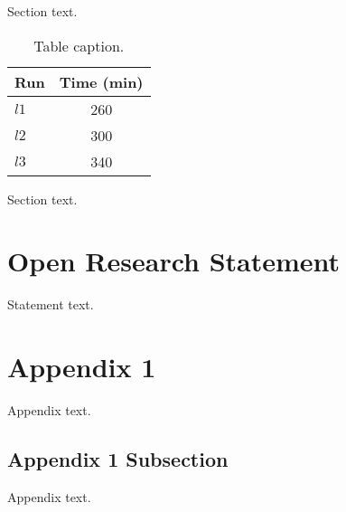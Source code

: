 \documentclass[published]{agujournal2025_4.22.25}
\begin{document}
Section text.



\begin{table}
\caption{Table caption.}
\centering
\begin{tabular}{l c}
    \hline
        Run  & Time (min)  \\
   \hline
      $l1$  & 260   \\
      $l2$  & 300   \\
      $l3$  & 340   \\
    \hline
\end{tabular}
\end{table}

Section text.


\section*{Open Research Statement}

Statement text.



%



\appendix  %

\section{Appendix 1}
Appendix text.

\subsection{Appendix 1 Subsection}
Appendix text.
\end{document}
